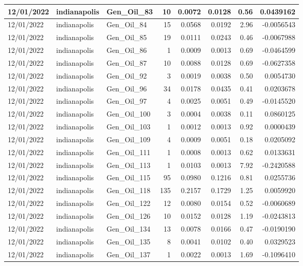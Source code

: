 \documentclass[
  letterpaper,
  DIV=11,
  numbers=noendperiod]{scrartcl}
\begin{document}
\begin{tabular}{l|l|l|r|r|r|r|r}
\hline
12/01/2022 & indianapolis & Gen\_Oil\_83 & 10 & 0.0072 & 0.0128 & 0.56 & 0.0439162\\
\hline
12/01/2022 & indianapolis & Gen\_Oil\_84 & 15 & 0.0568 & 0.0192 & 2.96 & -0.0056543\\
\hline
12/01/2022 & indianapolis & Gen\_Oil\_85 & 19 & 0.0111 & 0.0243 & 0.46 & -0.0067988\\
\hline
12/01/2022 & indianapolis & Gen\_Oil\_86 & 1 & 0.0009 & 0.0013 & 0.69 & -0.0464599\\
\hline
12/01/2022 & indianapolis & Gen\_Oil\_87 & 10 & 0.0088 & 0.0128 & 0.69 & -0.0627358\\
\hline
12/01/2022 & indianapolis & Gen\_Oil\_92 & 3 & 0.0019 & 0.0038 & 0.50 & 0.0054730\\
\hline
12/01/2022 & indianapolis & Gen\_Oil\_96 & 34 & 0.0178 & 0.0435 & 0.41 & 0.0203678\\
\hline
12/01/2022 & indianapolis & Gen\_Oil\_97 & 4 & 0.0025 & 0.0051 & 0.49 & -0.0145520\\
\hline
12/01/2022 & indianapolis & Gen\_Oil\_100 & 3 & 0.0004 & 0.0038 & 0.11 & 0.0860125\\
\hline
12/01/2022 & indianapolis & Gen\_Oil\_103 & 1 & 0.0012 & 0.0013 & 0.92 & 0.0000439\\
\hline
12/01/2022 & indianapolis & Gen\_Oil\_109 & 4 & 0.0009 & 0.0051 & 0.18 & 0.0205092\\
\hline
12/01/2022 & indianapolis & Gen\_Oil\_111 & 1 & 0.0008 & 0.0013 & 0.62 & 0.0133631\\
\hline
12/01/2022 & indianapolis & Gen\_Oil\_113 & 1 & 0.0103 & 0.0013 & 7.92 & -0.2420588\\
\hline
12/01/2022 & indianapolis & Gen\_Oil\_115 & 95 & 0.0980 & 0.1216 & 0.81 & 0.0255736\\
\hline
12/01/2022 & indianapolis & Gen\_Oil\_118 & 135 & 0.2157 & 0.1729 & 1.25 & 0.0059920\\
\hline
12/01/2022 & indianapolis & Gen\_Oil\_122 & 12 & 0.0080 & 0.0154 & 0.52 & -0.0060689\\
\hline
12/01/2022 & indianapolis & Gen\_Oil\_126 & 10 & 0.0152 & 0.0128 & 1.19 & -0.0243813\\
\hline
12/01/2022 & indianapolis & Gen\_Oil\_134 & 13 & 0.0078 & 0.0166 & 0.47 & -0.0190190\\
\hline
12/01/2022 & indianapolis & Gen\_Oil\_135 & 8 & 0.0041 & 0.0102 & 0.40 & 0.0329523\\
\hline
12/01/2022 & indianapolis & Gen\_Oil\_137 & 1 & 0.0022 & 0.0013 & 1.69 & -0.1096410\\

\end{tabular}
\end{document}
